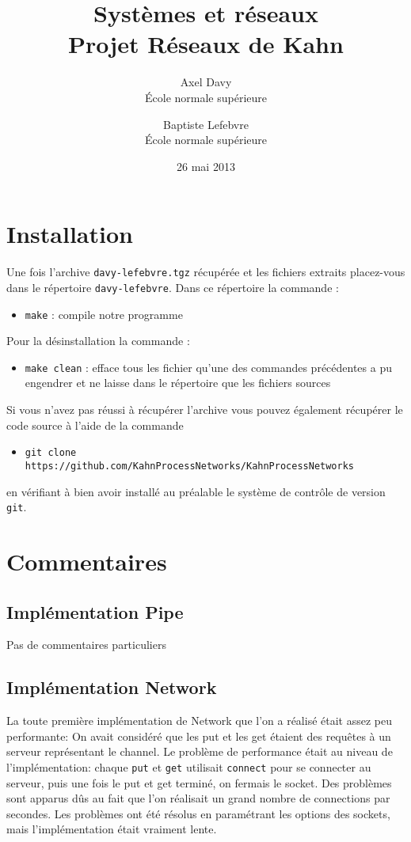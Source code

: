 \documentclass[a4paper]{article}
\begin{document}
	\title{\textbf{Systèmes et réseaux \\ Projet Réseaux de Kahn}}
	\author{Axel Davy \\ \'Ecole normale supérieure \and Baptiste Lefebvre \\ \'Ecole normale supérieure}
	\date{26 mai 2013}
	\maketitle


\section{Installation}

Une fois l'archive \texttt{davy-lefebvre.tgz} récupérée et les fichiers extraits placez-vous dans le répertoire \texttt{davy-lefebvre}. Dans ce répertoire la commande :
\begin{itemize}
	\item \texttt{make} : compile notre programme
\end{itemize}
Pour la désinstallation la commande :
\begin{itemize}
	\item \texttt{make clean} : efface tous les fichier qu'une des commandes précédentes a pu engendrer et ne laisse dans le répertoire que les fichiers sources
\end{itemize}
Si vous n'avez pas réussi à récupérer l'archive vous pouvez également récupérer le code source à l'aide de la commande
\begin{itemize}
	\item \texttt{git clone https://github.com/KahnProcessNetworks/KahnProcessNetworks}
\end{itemize}
en vérifiant à bien avoir installé au préalable le système de contrôle de version \texttt{git}.
 
\section{Commentaires}

\subsection{Implémentation Pipe}
Pas de commentaires particuliers

\subsection{Implémentation Network}
La toute première implémentation de Network que l'on a réalisé était assez
peu performante: On avait considéré que les put et les get étaient des
requêtes à un serveur représentant le channel. Le problème de performance
était au niveau de l'implémentation: chaque \verb!put! et \verb!get! utilisait
\verb!connect! pour se connecter au serveur, puis une fois le put et get
terminé, on fermais le socket. Des problèmes sont apparus dûs au fait que l'on réalisait
un grand nombre de connections par secondes. Les problèmes ont été résolus
en paramétrant les options des sockets,
mais l'implémentation était vraiment lente.
\end{document}

